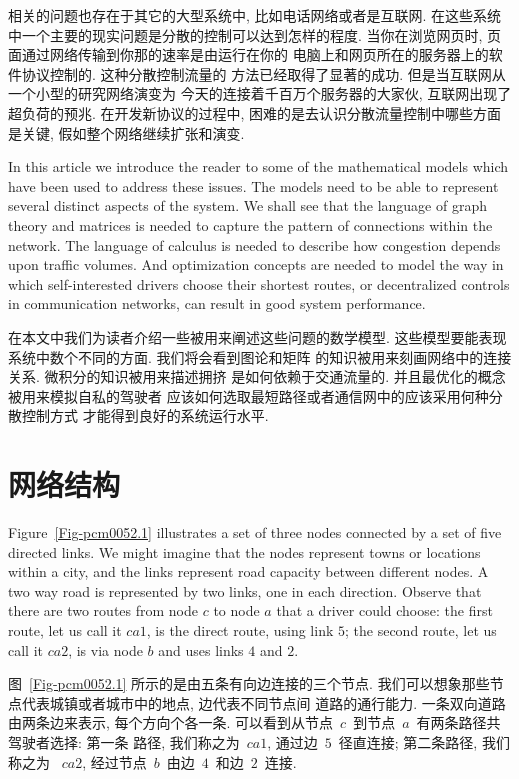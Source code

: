 \documentclass[a4paper,12pt, twocolumn]{article}
\begin{document}
相关的问题也存在于其它的大型系统中, 比如电话网络或者是互联网. 
在这些系统中一个主要的现实问题是分散的控制可以达到怎样的程度.
当你在浏览网页时, 页面通过网络传输到你那的速率是由运行在你的
电脑上和网页所在的服务器上的软件协议控制的. 这种分散控制流量的
方法已经取得了显著的成功. 但是当互联网从一个小型的研究网络演变为
今天的连接着千百万个服务器的大家伙, 互联网出现了超负荷的预兆.
在开发新协议的过程中, 困难的是去认识分散流量控制中哪些方面是关键, 
假如整个网络继续扩张和演变. 

In this article we introduce the reader to some of 
the mathematical models which have been used
to address these issues. The models need to be able to
represent several distinct aspects of the system.
We shall see that the language of graph theory and matrices
is needed to capture the pattern of
connections within the network. The language of calculus
is needed to describe how congestion depends upon traffic 
volumes. And optimization concepts are needed to 
model the way in which self-interested drivers choose
their shortest routes, or decentralized controls in 
communication networks, can result in good system performance.

在本文中我们为读者介绍一些被用来阐述这些问题的数学模型. 
这些模型要能表现系统中数个不同的方面. 我们将会看到图论和矩阵
的知识被用来刻画网络中的连接关系. 微积分的知识被用来描述拥挤
是如何依赖于交通流量的. 并且最优化的概念被用来模拟自私的驾驶者
应该如何选取最短路径或者通信网中的应该采用何种分散控制方式
才能得到良好的系统运行水平. 

\section{网络结构}

Figure~\ref{Fig-pcm0052.1} illustrates a set of  three nodes 
connected by a set of five directed links. 
We might imagine that the nodes represent towns or locations
within a city, and the links 
represent road capacity between different nodes. A two way road
is represented by two links, one in each direction. 
Observe that there are two routes from node $c$  
to node $a$ that a driver could choose: 
the first route, let us call it $ca1$, is the direct 
route, using link $5$; the second route, let us call it $ca2$,
is via node $b$ and uses links $4$ and $2$.  

图~\ref{Fig-pcm0052.1} 所示的是由五条有向边连接的三个节点.
我们可以想象那些节点代表城镇或者城市中的地点, 边代表不同节点间
道路的通行能力. 一条双向道路由两条边来表示, 每个方向个各一条. 
可以看到从节点~$c$~到节点~$a$~有两条路径共驾驶者选择: 第一条
路径, 我们称之为~$ca1$, 通过边~$5$~径直连接; 第二条路径, 我们称之为
~$ca2$, 经过节点~$b$~由边~$4$~和边~$2$~连接.
\end{document}
